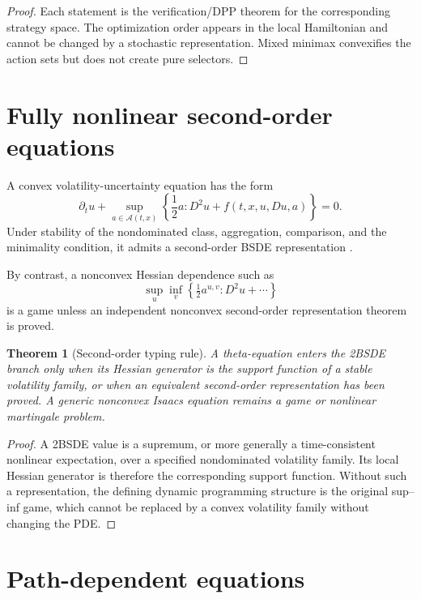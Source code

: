 \documentclass[11pt,reqno]{amsart}
\newtheorem{theorem}{Theorem}[section]
\theoremstyle{definition}
\theoremstyle{remark}
\newcommand{\A}{\mathcal A}
\begin{document}
\begin{proof}
Each statement is the verification/DPP theorem for the corresponding strategy
space.  The optimization order appears in the local Hamiltonian and cannot be
changed by a stochastic representation.  Mixed minimax convexifies the action
sets but does not create pure selectors.
\end{proof}

\section{Fully nonlinear second-order equations}\label{sec:second-order}

A convex volatility-uncertainty equation has the form
\begin{equation}\label{eq:convex-second}
 \partial_tu+\sup_{a\in\A(t,x)}
 \left\{\frac12a:D^2u+f(t,x,u,Du,a)\right\}=0.
\end{equation}
Under stability of the nondominated class, aggregation, comparison, and the
minimality condition, it admits a second-order BSDE representation
\cite{SonerTouziZhang2012}.

By contrast, a nonconvex Hessian dependence such as
\[
 \sup_u\inf_v\left\{\tfrac12a^{u,v}:D^2u+\cdots\right\}
\]
is a game unless an independent nonconvex second-order representation theorem
is proved.

\begin{theorem}[Second-order typing rule]\label{thm:second-order-rule}
A theta-equation enters the 2BSDE branch only when its Hessian generator is the
support function of a stable volatility family, or when an equivalent
second-order representation has been proved.  A generic nonconvex Isaacs
equation remains a game or nonlinear martingale problem.
\end{theorem}

\begin{proof}
A 2BSDE value is a supremum, or more generally a time-consistent nonlinear
expectation, over a specified nondominated volatility family.  Its local
Hessian generator is therefore the corresponding support function.  Without
such a representation, the defining dynamic programming structure is the
original sup--inf game, which cannot be replaced by a convex volatility family
without changing the PDE.
\end{proof}

\section{Path-dependent equations}\label{sec:path}
\end{document}
